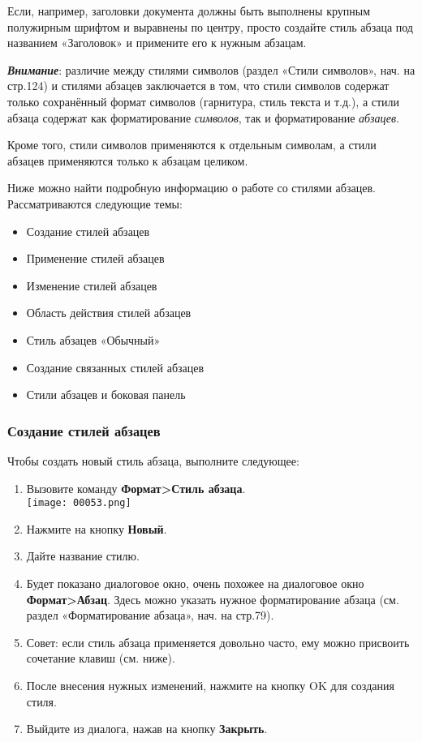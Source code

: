 \documentclass[a4paper,10pt]{article}
\begin{document}
Если, например, заголовки документа должны быть выполнены крупным полужирным шрифтом и выравнены по центру, просто создайте стиль абзаца под названием «Заголовок» и примените его к нужным абзацам.

\textbf{\textit{Внимание}}: различие между стилями символов (раздел «Стили символов», нач. на стр.124) и стилями абзацев заключается в том, что стили символов содержат только сохранённый формат символов (гарнитура, стиль текста и т.д.), а стили абзаца содержат как форматирование \textit{символов}, так и форматирование \textit{абзацев}.

Кроме того, стили символов применяются к отдельным символам, а стили абзацев применяются только к абзацам целиком.

Ниже можно найти подробную информацию о работе со стилями абзацев. Рассматриваются следующие темы:
\begin{itemize}
 \item Создание стилей абзацев
 \item Применение стилей абзацев
 \item Изменение стилей абзацев
 \item Область действия стилей абзацев
 \item Стиль абзацев «Обычный»
 \item Создание связанных стилей абзацев
 \item Стили абзацев и боковая панель
\end{itemize}

\subsubsection{Создание стилей абзацев}
Чтобы создать новый стиль абзаца, выполните следующее:
\begin{enumerate}
 \item Вызовите команду \textbf{Формат>Стиль абзаца}.\\
 \texttt{[image: 00053.png]}
 \item Нажмите на кнопку \textbf{Новый}.
 \item Дайте название стилю.
 \item Будет показано диалоговое окно, очень похожее на диалоговое окно \textbf{Формат>Абзац}. Здесь можно указать нужное форматирование абзаца (см. раздел «Форматирование абзаца», нач. на стр.79).
 \item Совет: если стиль абзаца применяется довольно часто, ему можно присвоить сочетание клавиш (см. ниже).
 \item После внесения нужных изменений, нажмите на кнопку OK для создания стиля.
 \item Выйдите из диалога, нажав на кнопку \textbf{Закрыть}.
\end{enumerate}
\end{document}
